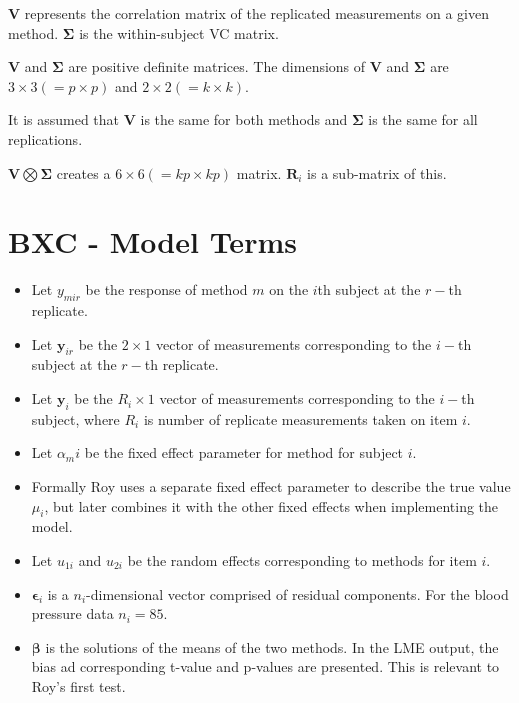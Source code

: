 \documentclass[12pt, a4paper]{report}
\theoremstyle{plain}
\theoremstyle{definition}
\theoremstyle{remark}
\begin{document}
$\boldsymbol{V}$ represents the correlation matrix of the replicated measurements on a given method.
$\boldsymbol{\Sigma}$ is the within-subject VC matrix.\\
\bigskip


$\boldsymbol{V}$ and $\boldsymbol{\Sigma}$ are positive
definite matrices. The dimensions of $\boldsymbol{V}$ and
$\boldsymbol{\Sigma}$ are $3 \times 3 ( = p \times p )$ and $ 2 \times
2 (= k \times k)$.\\
\bigskip


It is assumed that $\boldsymbol{V}$ is the same for both methods and $\boldsymbol{\Sigma}$ is
the same for all replications.\\
\bigskip

$\boldsymbol{V} \bigotimes \boldsymbol{\Sigma}$ creates a $ 6 \times 6 ( = kp \times
kp)$ matrix.
$\boldsymbol{R}_{i}$ is a sub-matrix of this.\\
\bigskip



\section{BXC - Model Terms}

\begin{itemize}
	\item Let $y_{mir}$ be the response of method $m$ on the $i$th subject
	at the $r-$th replicate.
	\item Let $\boldsymbol{y}_{ir}$ be the $2 \times 1$ vector of measurements
	corresponding to the $i-$th subject at the $r-$th replicate.
	\item Let $\boldsymbol{y}_{i}$ be the $R_i \times 1$ vector of
	measurements corresponding to the $i-$th subject, where $R_i$ is number of replicate measurements taken on item $i$.
	\item Let $\alpha_mi$ be the fixed effect parameter for method for subject $i$.
	\item Formally Roy uses a separate fixed effect parameter to describe the true value $\mu_i$, but later combines it with the other fixed effects when implementing the model.
	\item Let $u_{1i}$ and $u_{2i}$ be the random effects corresponding to methods for item $i$.
	
	\item $\boldsymbol{\epsilon}_{i}$ is a $n_{i}$-dimensional vector
	comprised of residual components. For the blood pressure data $n_{i} = 85$.
	
	\item $\boldsymbol{\beta}$ is the solutions of the means of the two methods. In the LME output, the bias ad corresponding
	t-value and p-values are presented. This is relevant to Roy's first test.\end{itemize}
\end{document}
